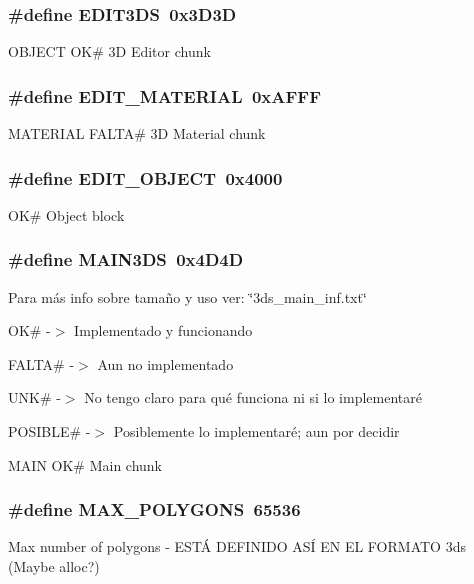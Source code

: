 \subsubsection[{EDIT3DS}]{\setlength{\rightskip}{0pt plus 5cm}\#define EDIT3DS~0x3D3D}\label{objetos_8h_af00ff38c2ca2f5278a135bc4302f23ce}
OBJECT OK\# 3D Editor chunk 
\subsubsection[{EDIT\_\-MATERIAL}]{\setlength{\rightskip}{0pt plus 5cm}\#define EDIT\_\-MATERIAL~0xAFFF}\label{objetos_8h_adc62d551c5959780c87369cdad3ec29c}
MATERIAL FALTA\# 3D Material chunk 
\subsubsection[{EDIT\_\-OBJECT}]{\setlength{\rightskip}{0pt plus 5cm}\#define EDIT\_\-OBJECT~0x4000}\label{objetos_8h_a3382608a5f7d73fc7e5539160aaa4b38}
OK\# Object block 
\subsubsection[{MAIN3DS}]{\setlength{\rightskip}{0pt plus 5cm}\#define MAIN3DS~0x4D4D}\label{objetos_8h_a989e0563d45aaff3ba8d7e4c0a740d39}
Para más info sobre tamaño y uso ver: \char`\"{}3ds\_\-main\_\-inf.txt\char`\"{}
\begin{DoxyItemize}
\item OK\# -\/$>$ Implementado y funcionando
\item FALTA\# -\/$>$ Aun no implementado
\item UNK\# -\/$>$ No tengo claro para qué funciona ni si lo implementaré
\item POSIBLE\# -\/$>$ Posiblemente lo implementaré; aun por decidir
\end{DoxyItemize}

MAIN OK\# Main chunk 
\subsubsection[{MAX\_\-POLYGONS}]{\setlength{\rightskip}{0pt plus 5cm}\#define MAX\_\-POLYGONS~65536}\label{objetos_8h_a0aaa578e910c66db37a344dcfc514f3b}
Max number of polygons -\/ ESTÁ DEFINIDO ASÍ EN EL FORMATO 3ds (Maybe alloc?) 
